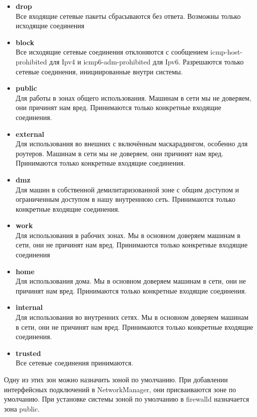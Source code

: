\documentclass[a4paper,10pt,twoside]{article}
\begin{document}
\begin{itemize}
 \item  \textbf{drop}\\
Все входящие сетевые пакеты сбрасываются без ответа. Возможны только исходящие соединения
\item \textbf{block}\\
Все исходящие сетевые соединения отклоняются с сообщением icmp-host-prohibited для Ipv4 и icmp6-adm-prohibited для Ipv6. Разрешаются только сетевые соединения, инициированные внутри системы.
\item \textbf{public}\\
Для работы в зонах общего использования. Машинам в сети мы не доверяем, они причинят нам вред. Принимаются только конкретные входящие соединения. 
\item \textbf{external}\\
Для использования во внешних с включённым маскарадингом, особенно для роутеров. Машинам в сети мы не доверяем, они причинят нам вред. Принимаются только конкретные входящие соединения.
\item \textbf{dmz}\\
Для машин в собственной демилитаризованной зоне с общим доступом и  ограниченным доступом в нашу внутреннюю сеть. Принимаются только конкретные входящие соединения.
\item \textbf{work}\\
Для использования в рабочих зонах. Мы в основном доверяем машинам в сети, они не причинят нам вред. Принимаются только конкретные входящие соединения
\item \textbf{home}\\
Для использования  дома. Мы в основном доверяем машинам в сети, они не причинят нам вред. Принимаются только конкретные входящие соединения.
\item \textbf{internal}\\
Для использования  во внутренних сетях. Мы в основном доверяем машинам в сети, они не причинят нам вред. Принимаются только конкретные входящие соединения.
\item \textbf{trusted}\\
Все сетевые соединения принимаются. 
\end{itemize}

Одну из этих зон можно назначить зоной по умолчанию. При добавлении интерфейсных подключений в NetworkManager, они присваиваются зоне по умолчанию. При установке системы зоной по умолчанию в firewalld назначается зона public.
\end{document}
